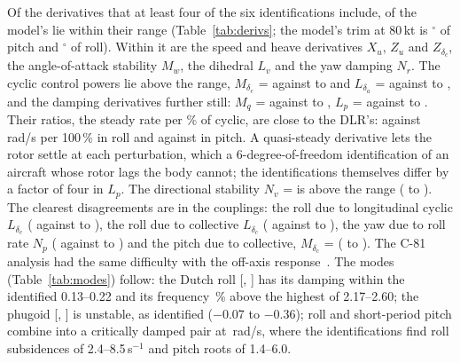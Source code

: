 \documentclass[10pt,a4paper,twocolumn]{article}
\begin{document}
Of the \NDerN{} derivatives that at least four of the six identifications include, \NDerIn{} of the model's lie within their range (Table~\ref{tab:derivs};
the model's trim at 80\,kt is \NDtheta$^\circ$ of pitch and \NDphi$^\circ$ of roll). Within it are the speed and heave derivatives $X_u$, $Z_u$ and
$Z_{\delta_c}$, the angle-of-attack stability $M_w$, the dihedral $L_v$ and the yaw damping $N_r$. The cyclic control powers lie above the range,
$M_{\delta_e}$ = \NdMlon{} against \NdMlonLo{} to \NdMlonHi{} and $L_{\delta_a}$ = \NdLlat{} against \NdLlatLo{} to \NdLlatHi, and the damping derivatives
further still: $M_q$ = \NdMq{} against \NdMqLo{} to \NdMqHi, $L_p$ = \NdLp{} against \NdLpLo{} to \NdLpHi. Their ratios, the steady rate per \% of cyclic,
are close to the DLR's: \NSsRoll{} against \NSsRollDlr\,rad/s per 100\,\% in roll and \NSsPitch{} against \NSsPitchDlr{} in pitch. A quasi-steady derivative
lets the rotor settle at each perturbation, which a 6-degree-of-freedom identification of an aircraft whose rotor lags the body cannot; the
identifications themselves differ by a factor of four in $L_p$. The directional stability $N_v$ = \NdNv{} is above the range (\NdNvLo{} to \NdNvHi). The
clearest disagreements are in the couplings: the roll due to longitudinal cyclic $L_{\delta_e}$
(\NdLlon{} against \NdLlonLo{} to \NdLlonHi), the roll due to collective $L_{\delta_c}$ (\NdLcol{} against \NdLcolLo{} to \NdLcolHi), the yaw due to roll rate $N_p$
(\NdNp{} against \NdNpLo{} to \NdNpHi) and the pitch due to collective, $M_{\delta_c}$ = \NdMcol{} (\NdMcolLo{} to \NdMcolHi). The C-81 analysis had the same
difficulty with the off-axis response~\cite{tr}. The modes (Table~\ref{tab:modes}) follow: the Dutch roll [\NMdrZeta, \NMdrW] has its damping within the identified
0.13--0.22 and its frequency \NMdrPct\,\% above the highest of 2.17--2.60; the phugoid [\NMphZeta, \NMphW] is unstable, as identified ($-$0.07 to $-$0.36); roll and short-period pitch combine into a
critically damped pair at \NMrpW\,rad/s, where the identifications find roll subsidences of 2.4--8.5\,s$^{-1}$ and pitch roots of 1.4--6.0.
\end{document}
